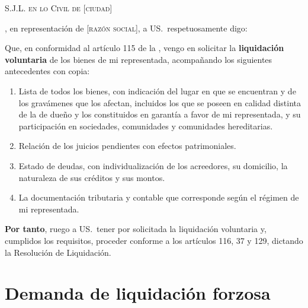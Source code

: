 \begin{escrito}
\small
\noindent\textsc{S.J.L. en lo Civil de} [\textsc{ciudad}]

\medskip
{}, en representación de
[\textsc{razón social}], a US.\ respetuosamente digo:

\medskip
Que, en conformidad al artículo 115 de la \LIR{}, vengo en solicitar la \textbf{liquidación
voluntaria} de los bienes de mi representada, acompañando los siguientes antecedentes con
copia:

\begin{enumerate}[leftmargin=1.6em]
  \item Lista de todos los bienes, con indicación del lugar en que se encuentran y de los
  gravámenes que los afectan, incluidos los que se poseen en calidad distinta de la de
  dueño y los constituidos en garantía a favor de mi representada, y su participación en
  sociedades, comunidades y comunidades hereditarias.
  \item Relación de los juicios pendientes con efectos patrimoniales.
  \item Estado de deudas, con individualización de los acreedores, su domicilio, la
  naturaleza de sus créditos y sus montos.
  \item La documentación tributaria y contable que corresponde según el régimen de mi
  representada.
\end{enumerate}

\medskip
\noindent\textbf{Por tanto}, ruego a US.\ tener por solicitada la liquidación voluntaria y,
cumplidos los requisitos, proceder conforme a los artículos 116, 37 y 129, dictando la
Resolución de Liquidación.
\end{escrito}

\section{Demanda de liquidación forzosa}

